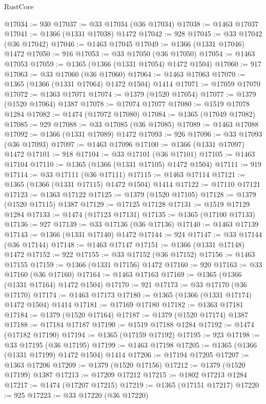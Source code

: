 \begin{lexlean}{RustCore}
\begin{coremodule}
@17034 := 930
@17037 := @33 @17034 (@36 @17034)
@17038 := @1463 @17037
@17041 := @1366 (@1331 @17038) @1472
@17042 := 928
@17045 := @33 @17042 (@36 @17042)
@17046 := @1463 @17045
@17049 := @1366 (@1331 @17046) @1472
@17050 := 916
@17053 := @33 @17050 (@36 @17050)
@17054 := @1463 @17053
@17059 := @1365 (@1366 (@1331 @17054) @1472 @1504)
@17060 := 917
@17063 := @33 @17060 (@36 @17060)
@17064 := @1463 @17063
@17070 := @1365 (@1366 (@1331 @17064) @1472 @1504) @1414
@17071 := @17059 @17070
@17072 := @1363 @17071
@17074 := @1379 (@1520 @17054)
@17077 := @1379 (@1520 @17064) @1387
@17078 := @17074 @17077
@17080 := @1519 @17078 @1284
@17082 := @1474 (@17072 @17080)
@17084 := @1365 (@17049 @17082)
@17085 := 929
@17088 := @33 @17085 (@36 @17085)
@17089 := @1463 @17088
@17092 := @1366 (@1331 @17089) @1472
@17093 := 926
@17096 := @33 @17093 (@36 @17093)
@17097 := @1463 @17096
@17100 := @1366 (@1331 @17097) @1472
@17101 := 918
@17104 := @33 @17101 (@36 @17101)
@17105 := @1463 @17104
@17110 := @1365 (@1366 (@1331 @17105) @1472 @1504)
@17111 := 919
@17114 := @33 @17111 (@36 @17111)
@17115 := @1463 @17114
@17121 := @1365 (@1366 (@1331 @17115) @1472 @1504) @1414
@17122 := @17110 @17121
@17123 := @1363 @17122
@17125 := @1379 (@1520 @17105)
@17128 := @1379 (@1520 @17115) @1387
@17129 := @17125 @17128
@17131 := @1519 @17129 @1284
@17133 := @1474 (@17123 @17131)
@17135 := @1365 (@17100 @17133)
@17136 := 927
@17139 := @33 @17136 (@36 @17136)
@17140 := @1463 @17139
@17143 := @1366 (@1331 @17140) @1472
@17144 := 924
@17147 := @33 @17144 (@36 @17144)
@17148 := @1463 @17147
@17151 := @1366 (@1331 @17148) @1472
@17152 := 922
@17155 := @33 @17152 (@36 @17152)
@17156 := @1463 @17155
@17159 := @1366 (@1331 @17156) @1472
@17160 := 920
@17163 := @33 @17160 (@36 @17160)
@17164 := @1463 @17163
@17169 := @1365 (@1366 (@1331 @17164) @1472 @1504)
@17170 := 921
@17173 := @33 @17170 (@36 @17170)
@17174 := @1463 @17173
@17180 := @1365 (@1366 (@1331 @17174) @1472 @1504) @1414
@17181 := @17169 @17180
@17182 := @1363 @17181
@17184 := @1379 (@1520 @17164)
@17187 := @1379 (@1520 @17174) @1387
@17188 := @17184 @17187
@17190 := @1519 @17188 @1284
@17192 := @1474 (@17182 @17190)
@17194 := @1365 (@17159 @17192)
@17195 := 923
@17198 := @33 @17195 (@36 @17195)
@17199 := @1463 @17198
@17205 := @1365 (@1366 (@1331 @17199) @1472 @1504) @1414
@17206 := @17194 @17205
@17207 := @1363 @17206
@17209 := @1379 (@1520 @17156)
@17212 := @1379 (@1520 @17199) @1387
@17213 := @17209 @17212
@17215 := @1802 @17213 @1284
@17217 := @1474 (@17207 @17215)
@17219 := @1365 (@17151 @17217)
@17220 := 925
@17223 := @33 @17220 (@36 @17220)

\end{coremodule}
\end{lexlean}

